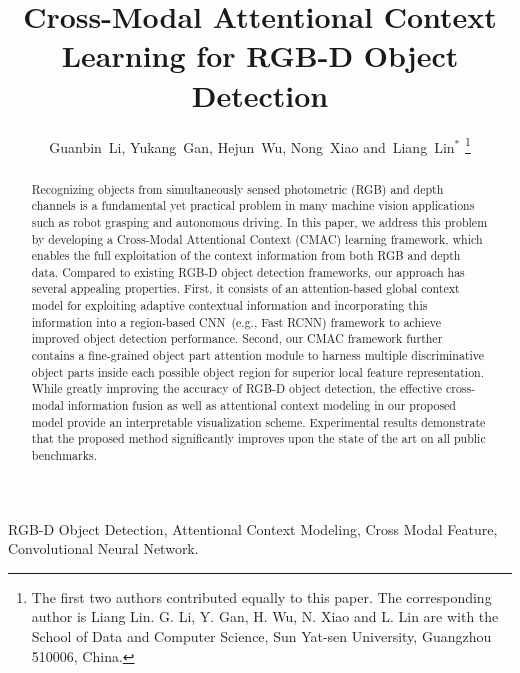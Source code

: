 \documentclass[journal]{IEEEtran}
\begin{document}
\title{Cross-Modal Attentional Context Learning for RGB-D Object Detection}

\author{
        Guanbin~Li,
        Yukang~Gan,
        Hejun~Wu,       
        Nong~Xiao                
        and~Liang~Lin$^*$
\thanks{The first two authors contributed equally to this paper. The corresponding author is Liang Lin. G. Li, Y. Gan, H. Wu, N. Xiao and L. Lin are with the School of Data and Computer Science, Sun Yat-sen University, Guangzhou 510006, China.}
}


















\maketitle

\begin{abstract}
Recognizing objects from simultaneously sensed photometric (RGB) and depth channels is a fundamental yet practical problem in many machine vision applications such as robot grasping and autonomous driving. In this paper, we address this problem by developing a Cross-Modal Attentional Context (CMAC) learning framework, which enables the full exploitation of the context information from both RGB and depth data. Compared to existing RGB-D object detection frameworks, our approach has several appealing properties. First, it consists of an attention-based global context model for exploiting adaptive contextual information and incorporating this information into a region-based CNN~(e.g., Fast RCNN) framework to achieve improved object detection performance. Second, our CMAC framework further contains a fine-grained object part attention module to harness multiple discriminative object parts inside each possible object region for superior local feature representation. While greatly improving the accuracy of RGB-D object detection, the effective cross-modal information fusion as well as attentional context modeling in our proposed model  provide an interpretable visualization scheme. Experimental results demonstrate that the proposed method significantly improves upon the state of the art on all public benchmarks. 
\end{abstract}

\begin{IEEEkeywords}
RGB-D Object Detection, Attentional Context Modeling, Cross Modal Feature, Convolutional Neural Network.  
\end{IEEEkeywords}
\end{document}
